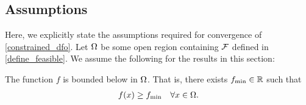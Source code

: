 



\subsection{Assumptions}
Here, we explicitly state the assumptions required for convergence of \cref{constrained_dfo}.
Let $\Omega$ be some open region containing ${\mathcal F}$ defined in \cref{define_feasible}.
We assume the following for the results in this section:



\begin{assumption}
\label{bounded_below_assumption}
The function $f$ is bounded below in $ \Omega $. That is, there exists $f_{\text{min}} \in \mathbb R$ such that
\begin{align*}
f(x) \ge f_{\text{min}} \quad  \forall x \in \Omega.
\end{align*}
\end{assumption}


